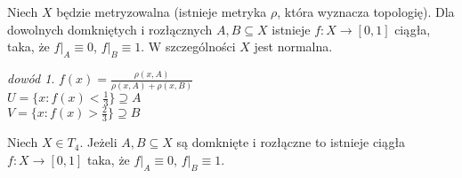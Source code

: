 \documentclass[twoside,10pt]{article}
\theoremstyle{definition}
\theoremstyle{definition}
\theoremstyle{definition}
\theoremstyle{definition}
\theoremstyle{remark}
\newtheorem*{dd}{dowód}
\theoremstyle{definition}
\theoremstyle{definition}
\theoremstyle{definition}
\theoremstyle{definition}
\theoremstyle{definition}
\theoremstyle{definition}
\begin{document}
\begin{tw} 
    Niech $X$ będzie metryzowalna (istnieje metryka $\rho$, która wyznacza topologię). Dla dowolnych domkniętych 
    i rozłącznych $A, B \subseteq X$ istnieje $ f: X \to [0,1]$ ciągła, taka, że $f |_A \equiv 0$, 
    $f |_B \equiv 1$. W szczególności $X$ jest normalna.
\end{tw} 
\begin{dd} 
    $f(x) = \frac{\rho(x,A)}{\rho(x,A)+\rho(x,B)}$ \\ 
    $U = \{ x : f(x) < \frac{1}{3} \} \supseteq A$ \\ 
    $V = \{ x: f(x) > \frac{2}{3} \} \supseteq B$
\end{dd}    
\begin{tw} 
    Niech $X \in T_4$. Jeżeli $A,B \subseteq X$ są domknięte i rozłączne to istnieje ciągła $f: X \to [0,1]$ 
    taka, że $f|_A \equiv 0$, $f|_B \equiv 1$.
\end{tw} 
\end{document}
